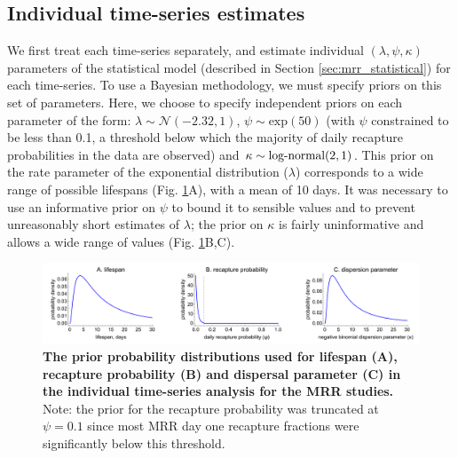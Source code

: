 \documentclass[12pt]{article}
\begin{document}
\subsection{Individual time-series estimates}\label{sec:MRR_individual_analysis}
We first treat each time-series separately, and estimate individual $(\lambda,\psi,\kappa)$ parameters of the statistical model (described in Section \ref{sec:mrr_statistical}) for each time-series. To use a Bayesian methodology, we must specify priors on this set of parameters. Here, we choose to specify independent priors on each parameter of the form: $\lambda\sim \mathcal{N}(-2.32,1)$, $\psi\sim \text{exp}(50)$ (with $\psi$ constrained to be less than 0.1, a threshold below which the majority of daily recapture probabilities in the data are observed) and $\kappa\sim \textnormal{log-normal}(2,1)$. This prior on the rate parameter of the exponential distribution ($\lambda$) corresponds to a wide range of possible lifespans (Fig. \ref{fig:mrr_individualTimeSeries_priors}A), with a mean of 10 days. It was necessary to use an informative prior on $\psi$ to bound it to sensible values and to prevent unreasonably short estimates of $\lambda$; the prior on $\kappa$ is fairly uninformative and allows a wide range of values (Fig. \ref{fig:mrr_individualTimeSeries_priors}B,C). 


\begin{figure}[h]
	\centerline{\includegraphics[width=1.25\textwidth]{./Figure_files/mrr_individualTimeSeries_priors.pdf}}
	\caption{\textbf{The prior probability distributions used for lifespan (A), recapture probability (B) and dispersal parameter (C) in the individual time-series analysis for the MRR studies.} Note: the prior for the recapture probability was truncated at $\psi=0.1$ since most MRR day one recapture fractions were significantly below this threshold.}
	\label{fig:mrr_individualTimeSeries_priors}
\end{figure}
\end{document}
